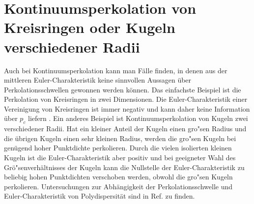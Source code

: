 \section[Gegenbeispiele -- Kontinuumsperkolation]{Kontinuumsperkolation von Kreisringen oder Kugeln verschiedener Radii}
Auch bei Kontinuumsperkolation kann man F\"alle finden, in denen aus der mittleren Euler-Charakteristik keine sinnvollen Aussagen \"uber Perkolationsschwellen gewonnen werden k\"onnen. Das einfachste Beispiel ist die Perkolation von Kreisringen in zwei Dimensionen. Die Euler-Charakteristik einer Vereinigung von Kreisringen ist immer negativ und kann daher keine Information \"uber $p_c$ liefern \cite{Mecke:94}. Ein anderes Beispiel ist Kontinuumsperkolation von Kugeln zwei verschiedener Radii. Hat ein kleiner Anteil der Kugeln einen gro"sen Radius und die \"ubrigen Kugeln einen sehr kleinen Radius, werden die gro"sen Kugeln bei gen\"ugend hoher Punktdichte perkolieren. Durch die vielen isolierten kleinen Kugeln ist die Euler-Charakteristik aber positiv und bei geeigneter Wahl des Gr\"o"senverh\"altnisses der Kugeln kann die Nullstelle der Euler-Charakteristik zu beliebig hohen Punktdichten verschoben werden, obwohl die gro"sen Kugeln perkolieren. Untersuchungen zur Abh\"angigkeit der Perkolationsschwelle und Euler-Charakteristik von Polydispersit\"at sind in Ref. \cite{Mecke:02} zu finden.